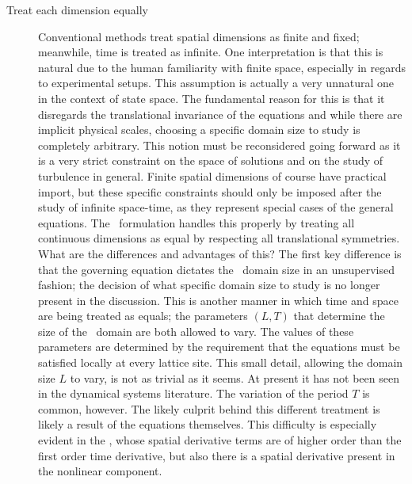 \begin{description}
{\begin{description}
\item[Treat each dimension equally]
Conventional methods treat spatial dimensions
as finite and fixed; meanwhile, time is treated as infinite.
One interpretation is that this is natural due to the
human familiarity with finite space, especially in regards
to experimental setups.
This assumption is actually a very unnatural one
in the context of state space. The fundamental reason
for this is that it disregards
the translational invariance of the equations and while there
are implicit physical scales, choosing a specific domain size
to study is completely arbitrary. This notion
must be reconsidered going forward as it is a very strict constraint
on the space of solutions and on the study of turbulence in general.
Finite spatial dimensions of course have practical import, but
these specific constraints should only be imposed after the
study of infinite space-time, as they represent special
cases of the general equations. The \spt\ formulation handles
this properly by treating all continuous dimensions as equal
by respecting all translational symmetries.
What are the differences and advantages of this?
The first key difference is that the governing equation
dictates the \spt\ domain size in an unsupervised
fashion; the decision of what specific domain size
to study is no longer present in the discussion.
This is another manner in which
time and space are being treated as equals; the parameters $(L,T)$
that determine the size of the \spt\ domain are both allowed to vary.
The values of these parameters
are determined by the requirement that the equations
must be satisfied locally at every lattice site.
This small detail, allowing the domain size $L$ to vary,
is not as trivial as it seems. At present it has not been seen in
the dynamical systems literature. The variation of the period $T$ is
common, however. The likely culprit behind this different treatment
is likely a result of the equations themselves. This difficulty
is especially evident in the \KSe, whose spatial derivative terms
are of higher order than the first order time derivative, but also
there is a spatial derivative present in the nonlinear component.


\end{description}}
\end{description}
